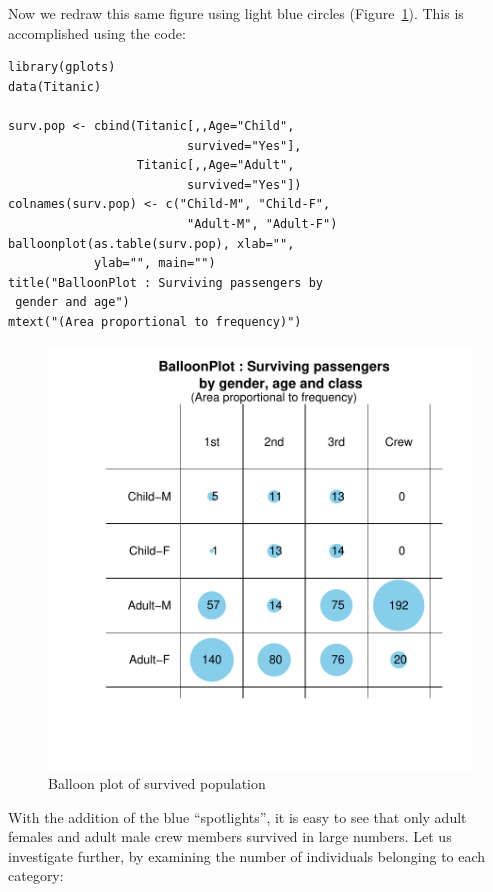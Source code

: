 \documentclass[a4paper]{report}
\begin{document}
\begin{article}
Now we redraw this same figure using light blue circles
(Figure~\ref{figure:Surv.Pop}).  This is accomplished using the code:

{\small
\begin{verbatim}
library(gplots)
data(Titanic)

surv.pop <- cbind(Titanic[,,Age="Child", 
                         survived="Yes"],
                  Titanic[,,Age="Adult", 
                         survived="Yes"])
colnames(surv.pop) <- c("Child-M", "Child-F",
                         "Adult-M", "Adult-F")
balloonplot(as.table(surv.pop), xlab="", 
            ylab="", main="")
title("BalloonPlot : Surviving passengers by
 gender and age")
mtext("(Area proportional to frequency)")
\end{verbatim}
 }

\begin{figure}
\includegraphics[width=\textwidth]{SurvivedPop.pdf}
\caption{\label{figure:Surv.Pop}
Balloon plot of survived population}
\end{figure}

With the addition of the blue ``spotlights'', it is easy to see that
only adult females and adult male crew members survived in large
numbers. Let us investigate further, by examining the number
of individuals belonging to each category:


\end{article}
\end{document}
